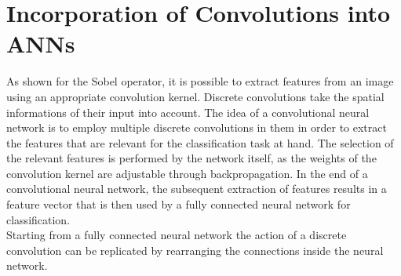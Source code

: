 \section{Incorporation of Convolutions into ANNs}
\label{sec:CNN}

As shown for the Sobel operator, it is possible to extract features from an image using an appropriate convolution kernel. Discrete convolutions take the spatial informations of their input into account. The idea of a convolutional neural network is to employ multiple discrete convolutions in them in order to extract the features that are relevant for the classification task at hand. The selection of the relevant features is performed by the network itself, as the weights of the convolution kernel are adjustable through backpropagation. In the end of a convolutional neural network, the subsequent extraction of features results in a feature vector that is then used by a fully connected neural network for classification.\\

Starting from a fully connected neural network the action of a discrete convolution can be replicated by rearranging the connections inside the neural network. \\ %



